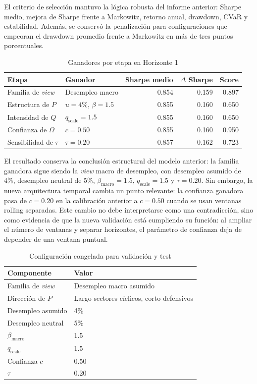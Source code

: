 \documentclass[11pt]{article}
\begin{document}
El criterio de selecci\'on mantuvo la l\'ogica robusta del informe anterior: Sharpe medio, mejora de Sharpe frente a Markowitz, retorno anual, drawdown, CVaR y estabilidad. Adem\'as, se conserv\'o la penalizaci\'on para configuraciones que empeoran el drawdown promedio frente a Markowitz en m\'as de tres puntos porcentuales.

\begin{table}[H]
\centering
\caption{Ganadores por etapa en Horizonte 1}
\label{tab:ganadores}
\begin{tabular}{l l r r r}
\toprule
Etapa & Ganador & Sharpe medio & $\Delta$ Sharpe & Score \\
\midrule
Familia de \textit{view} & Desempleo macro & 0.854 & 0.159 & 0.897 \\
Estructura de $P$ & $u=4\%$, $\beta=1.5$ & 0.855 & 0.160 & 0.650 \\
Intensidad de $Q$ & $q_{\text{scale}}=1.5$ & 0.855 & 0.160 & 0.650 \\
Confianza de $\Omega$ & $c=0.50$ & 0.855 & 0.160 & 0.950 \\
Sensibilidad de $\tau$ & $\tau=0.20$ & 0.857 & 0.162 & 0.723 \\
\bottomrule
\end{tabular}
\end{table}

El resultado conserva la conclusi\'on estructural del modelo anterior: la familia ganadora sigue siendo la \textit{view} macro de desempleo, con desempleo asumido de 4\%, desempleo neutral de 5\%, $\beta_{\text{macro}}=1.5$, $q_{\text{scale}}=1.5$ y $\tau=0.20$. Sin embargo, la nueva arquitectura temporal cambia un punto relevante: la confianza ganadora pasa de $c=0.20$ en la calibraci\'on anterior a $c=0.50$ cuando se usan ventanas rolling separadas. Este cambio no debe interpretarse como una contradicci\'on, sino como evidencia de que la nueva validaci\'on est\'a cumpliendo su funci\'on: al ampliar el n\'umero de ventanas y separar horizontes, el par\'ametro de confianza deja de depender de una ventana puntual.

\begin{table}[H]
\centering
\caption{Configuraci\'on congelada para validaci\'on y test}
\label{tab:config}
\begin{tabular}{l l}
\toprule
Componente & Valor \\
\midrule
Familia de \textit{view} & Desempleo macro asumido \\
Direcci\'on de $P$ & Largo sectores c\'iclicos, corto defensivos \\
Desempleo asumido & 4\% \\
Desempleo neutral & 5\% \\
$\beta_{\text{macro}}$ & 1.5 \\
$q_{\text{scale}}$ & 1.5 \\
Confianza $c$ & 0.50 \\
$\tau$ & 0.20 \\
\bottomrule
\end{tabular}
\end{table}
\end{document}
